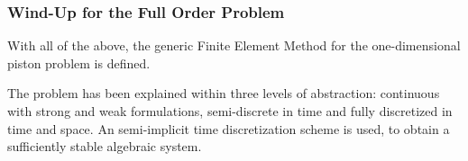 \documentclass[../../thesis.tex]{subfiles}
\newcommand{\inner}[2]{\left<#1, #2\right>}
\begin{document}



\subsubsection{Wind-Up for the Full Order Problem}
With all of the above, the generic Finite Element Method for the one-dimensional piston problem is defined.

The problem has been explained within three levels of abstraction: continuous with strong and weak formulations, semi-discrete in time and fully discretized in time and space.
An semi-implicit time discretization scheme is used, to obtain a sufficiently stable algebraic system.
\end{document}
